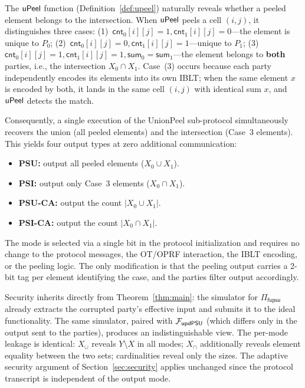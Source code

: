 The $\mathsf{uPeel}$ function (Definition~\ref{def:upeel}) naturally reveals whether a
peeled element belongs to the intersection. When $\mathsf{uPeel}$ peels a cell
$(i,j)$, it distinguishes three cases: (1)~$\mathsf{cnt}_0[i][j]=1,
\mathsf{cnt}_1[i][j]=0$---the element is unique to $P_0$;
(2)~$\mathsf{cnt}_0[i][j]=0, \mathsf{cnt}_1[i][j]=1$---unique to $P_1$;
(3)~$\mathsf{cnt}_0[i][j]=1, \mathsf{cnt}_1[i][j]=1, \mathsf{sum}_0=
\mathsf{sum}_1$---the element belongs to \textbf{both} parties, i.e., the
intersection $X_0 \cap X_1$. Case~(3) occurs because each party independently
encodes its elements into its own IBLT; when the same element $x$ is encoded
by both, it lands in the same cell $(i,j)$ with identical sum $x$, and
$\mathsf{uPeel}$ detects the match.

Consequently, a single execution of the UnionPeel sub-protocol simultaneously
recovers the union (all peeled elements) and the intersection (Case~3
elements). This yields four output types at zero additional communication:
\begin{itemize}
\item \textbf{PSU:} output all peeled elements ($X_0 \cup X_1$).
\item \textbf{PSI:} output only Case~3 elements ($X_0 \cap X_1$).
\item \textbf{PSU-CA:} output the count $|X_0 \cup X_1|$.
\item \textbf{PSI-CA:} output the count $|X_0 \cap X_1|$.
\end{itemize}

The mode is selected via a single bit in the protocol initialization and
requires no change to the protocol messages, the OT/OPRF interaction, the
IBLT encoding, or the peeling logic. The only modification is that the
peeling output carries a 2-bit tag per element identifying the case, and the
parties filter output accordingly.

Security inherits directly from Theorem~\ref{thm:main}: the simulator for
$\Pi_{\mathsf{fupsu}}$ already extracts the corrupted party's effective input
and submits it to the ideal functionality. The same simulator, paired with
$\mathcal{F}_{\mathsf{updPSU}}$ (which differs only in the output sent to the parties),
produces an indistinguishable view. The per-mode leakage is identical:
$X_\cup$ reveals $Y \setminus X$ in all modes; $X_\cap$ additionally reveals
element equality between the two sets; cardinalities reveal only the sizes.
The adaptive security argument of Section~\ref{sec:security} applies
unchanged since the protocol transcript is independent of the output mode.

